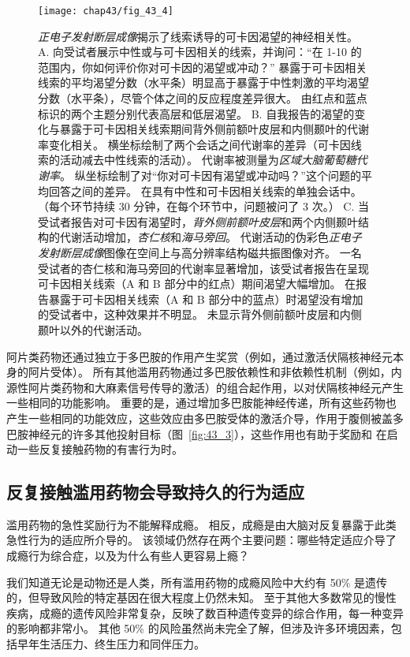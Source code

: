 \begin{figure}[htbp]
	\centering
	\texttt{[image: chap43/fig\_43\_4]}
	\caption{\textit{正电子发射断层成像}揭示了线索诱导的可卡因渴望的神经相关性\cite{grant1996activation}。
		A. 向受试者展示中性或与可卡因相关的线索，并询问：“在 1-10 的范围内，你如何评价你对可卡因的渴望或冲动？” 
		暴露于可卡因相关线索的平均渴望分数（水平条）明显高于暴露于中性刺激的平均渴望分数（水平条），尽管个体之间的反应程度差异很大。
		由红点和蓝点标识的两个主题分别代表高层和低层渴望。
		B. 自我报告的渴望的变化与暴露于可卡因相关线索期间背外侧前额叶皮层和内侧颞叶的代谢率变化相关。
		横坐标绘制了两个会话之间代谢率的差异（可卡因线索的活动减去中性线索的活动）。
		代谢率被测量为\textit{区域大脑葡萄糖代谢率}。
		纵坐标绘制了对“你对可卡因有渴望或冲动吗？”这个问题的平均回答之间的差异。
		在具有中性和可卡因相关线索的单独会话中。
		（每个环节持续 30 分钟，在每个环节中，问题被问了 3 次。）
		C. 当受试者报告对可卡因有渴望时，\textit{背外侧前额叶皮层}和两个内侧颞叶结构的代谢活动增加，\textit{杏仁核}和\textit{海马旁回}。
		代谢活动的伪彩色\textit{正电子发射断层成像}图像在空间上与高分辨率结构磁共振图像对齐。
		一名受试者的杏仁核和海马旁回的代谢率显著增加，该受试者报告在呈现可卡因相关线索（A 和 B 部分中的红点）期间渴望大幅增加。
		在报告暴露于可卡因相关线索（A 和 B 部分中的蓝点）时渴望没有增加的受试者中，这种效果并不明显。
		未显示背外侧前额叶皮层和内侧颞叶以外的代谢活动。}
	\label{fig:43_4}
\end{figure}


阿片类药物还通过独立于多巴胺的作用产生奖赏（例如，通过激活伏隔核神经元本身的阿片受体）。
所有其他滥用药物通过多巴胺依赖性和非依赖性机制（例如，内源性阿片类药物和大麻素信号传导的激活）的组合起作用，以对伏隔核神经元产生一些相同的功能影响。
重要的是，通过增加多巴胺能神经传递，所有这些药物也产生一些相同的功能效应，这些效应由多巴胺受体的激活介导，作用于腹侧被盖多巴胺神经元的许多其他投射目标（图~\ref{fig:43_3}），这些作用也有助于奖励和 在启动一些反复接触药物的有害行为时。



\subsection{反复接触滥用药物会导致持久的行为适应}

滥用药物的急性奖励行为不能解释成瘾。
相反，成瘾是由大脑对反复暴露于此类急性行为的适应所介导的。
该领域仍然存在两个主要问题：哪些特定适应介导了成瘾行为综合症，以及为什么有些人更容易上瘾？


我们知道无论是动物还是人类，所有滥用药物的成瘾风险中大约有 50\% 是遗传的，但导致风险的特定基因在很大程度上仍然未知。
至于其他大多数常见的慢性疾病，成瘾的遗传风险非常复杂，反映了数百种遗传变异的综合作用，每一种变异的影响都非常小。
其他 50\% 的风险虽然尚未完全了解，但涉及许多环境因素，包括早年生活压力、终生压力和同伴压力。


